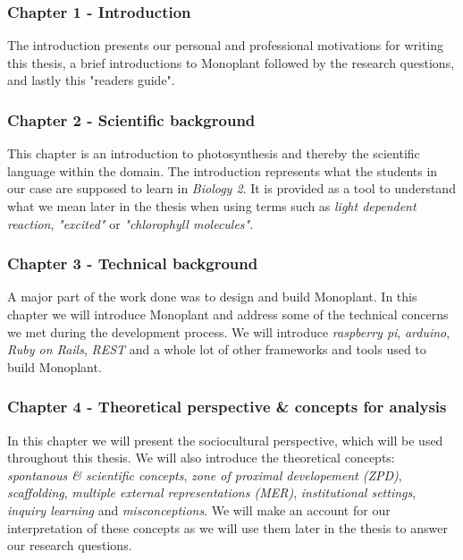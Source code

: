 \subsubsection*{Chapter 1 - Introduction}
The introduction presents our personal and professional motivations for writing this thesis, a brief introductions to Monoplant followed by the research questions, and lastly this "readers guide".

\subsubsection*{Chapter 2 - Scientific background}
This chapter is an introduction to photosynthesis and thereby the scientific language within the domain. The introduction represents what the students in our case are supposed to learn in \emph{Biology 2}. It is provided as a tool to understand what we mean later in the thesis when using terms such as \emph{light dependent reaction}, \emph{"excited"} or \emph{"chlorophyll molecules"}.

\subsubsection*{Chapter 3 - Technical background}
A major part of the work done was to design and build Monoplant. In this chapter we will introduce Monoplant and address some of the technical concerns we met during the development process. We will introduce \emph{raspberry pi}, \emph{arduino}, \emph{Ruby on Rails}, \emph{REST} and a whole lot of other frameworks and tools used to build Monoplant.

\subsubsection*{Chapter 4 - Theoretical perspective \& concepts for analysis}

In this chapter we will present the sociocultural perspective, which will be used throughout this thesis. We will also introduce the theoretical concepts: \emph{spontanous \& scientific concepts}, \emph{zone of proximal developement (ZPD)}, \emph{scaffolding}, \emph{multiple external representations (MER)}, \emph{institutional settings}, \emph{inquiry learning} and \emph{misconceptions}. We will make an account for our interpretation of these concepts as we will use them later in the thesis to answer our research questions. 

